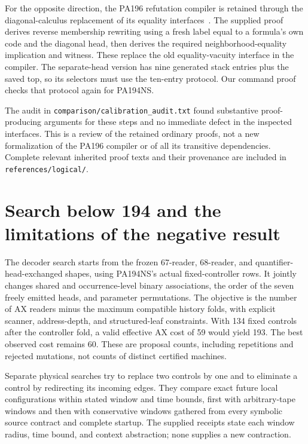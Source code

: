 \documentclass[11pt,letterpaper]{article}
\newcommand{\file}[1]{\texttt{\nolinkurl{#1}}}
\begin{document}
For the opposite direction, the PA196 refutation compiler is retained
through the diagonal-calculus replacement of its equality interfaces~\cite{chang,calibration,primary}.
The supplied proof derives reverse membership rewriting using a fresh
label equal to a formula's own code and the diagonal head, then derives
the required neighborhood-equality implication and witness. These replace
the old equality-vacuity interface in the compiler. The separate-head
version has nine generated stack entries plus the saved top, so its
selectors must use the ten-entry protocol. Our command proof checks that
protocol again for PA194NS.

The audit in \file{comparison/calibration_audit.txt} found substantive
proof-producing arguments for these steps and no immediate defect in
the inspected interfaces. This is a review of the retained ordinary
proofs, not a new formalization of the PA196 compiler or of all its
transitive dependencies. Complete relevant inherited proof texts and
their provenance are included in \file{references/logical/}.

\section{Search below 194 and the limitations of the negative result}
\label{sec:search}



The decoder search starts from the frozen 67-reader, 68-reader, and
quantifier-head-exchanged shapes, using PA194NS's actual fixed-controller
rows. It jointly changes shared and occurrence-level binary associations,
the order of the seven freely emitted heads, and parameter permutations.
The objective is the number of AX readers minus the maximum compatible
history folds, with explicit scanner, address-depth, and structured-leaf
constraints. With 134 fixed controls after the controller fold, a valid
effective AX cost of 59 would yield 193. The best observed cost remains 60.
These are proposal counts, including repetitions and rejected mutations,
not counts of distinct certified machines.

Separate physical searches try to replace two controls by one and to
eliminate a control by redirecting its incoming edges. They compare exact
future local configurations within stated window and time bounds, first
with arbitrary-tape windows and then with conservative windows gathered
from every symbolic source contract and complete startup. The supplied
receipts state each window radius, time bound, and context abstraction;
none supplies a new contraction.
\end{document}
